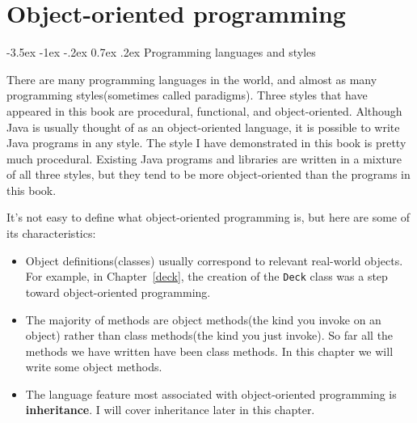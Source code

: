 \documentclass{book}
\makeatletter
\newcounter{exercisenum}
\renewcommand{\section}{\@startsection 
    {section} {1} {0mm}%
    {-3.5ex \@plus -1ex \@minus -.2ex}%
    {0.7ex \@plus.2ex}%
    {\normalfont\Large\bfseries}}
\newcommand{\clearemptydoublepage}{\newpage{\pagestyle{empty}\cleardoublepage}}
\newcommand{\beforechapter}{
    \cleardoublepage 
    \setcounter{exercisenum}{0}
}
\makeatother
\begin{document}
\beforechapter
\label{chap13}
\chapter{Object-oriented programming}

\section{Programming languages and styles}

There are many programming languages in the world, and almost as many
programming styles(sometimes called paradigms).  Three styles that
have appeared in this book are procedural, functional, and
object-oriented.  Although Java is usually thought of as an
object-oriented language, it is possible to write Java programs in any
style.  The style I have demonstrated in this book is pretty much
procedural.  Existing Java programs and libraries are
written in a mixture of all three styles, but they tend to be more
object-oriented than the programs in this book.

It's not easy to define what object-oriented programming is,
but here are some of its characteristics:

\begin{itemize}

\item Object definitions(classes) usually correspond to 
relevant real-world objects.  For example, in Chapter~\ref{deck},
the creation of the {\tt Deck} class was a step toward object-oriented
programming.

\item The majority of methods are object methods(the kind you
invoke on an object) rather than class methods(the kind you just
invoke).  So far all the methods we have written have been class
methods.  In this chapter we will write some object methods.

\item The language feature most associated with object-oriented
programming is {\bf inheritance}.  I will cover inheritance later in
this chapter.

\end{itemize}

\end{document}
